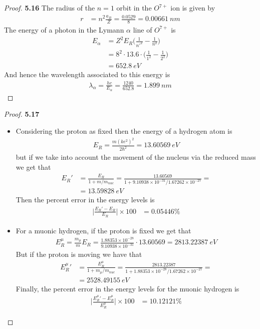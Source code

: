 \documentclass[11pt]{article}
\theoremstyle{definition}
\begin{document}
\begin{proof}{\textbf{5.16}}
    The radius of the $n = 1$ orbit in the $O^{7+}$ ion is given by
    \begin{align*}
        r &= n^2\frac{a_B}{Z} = \frac{0.0529}{8} = 0.00661~nm
    \end{align*}
    The energy of a photon in the Lymann $\alpha$ line of $O^{7+}$ is
    \begin{align*}
        E_\alpha &= Z^2E_R\bigg(\frac{1}{n'^2} - \frac{1}{n^2}\bigg)\\
            &= 8^2\cdot 13.6\cdot\bigg(\frac{1}{1^2} - \frac{1}{2^2}\bigg)\\
            &= 652.8~eV
    \end{align*}
    And hence the wavelength associated to this energy is
    \begin{align*}
        \lambda_\alpha = \frac{hc}{E_\alpha} = \frac{1240}{652.8} = 1.899~nm
    \end{align*}
\end{proof}
\cleardoublepage
\begin{proof}{\textbf{5.17}}
\begin{itemize}
    \item [\textbf{(a)}] Considering the proton as fixed then the energy of
    a hydrogen atom is
    \begin{align*}
        E_R = \frac{m(ke^2)^2}{2\hbar^2} = 13.60569~eV
    \end{align*}
    but if we take into account the movement of the nucleus via the reduced
    mass we get that
    \begin{align*}
        E_R' &= \frac{E_R}{1+ m/m_{nuc}}
        = \frac{13.60569}{1 + {9.10938\times10^{-31}/1.67262\times10^{-27}}} = \\
        &= 13.59828~eV
    \end{align*}
    Then the percent error in the energy levels is
    \begin{align*}
        \bigg|\frac{E_R' - E_R}{E_R}\bigg| \times 100 &= 0.05446 \%
    \end{align*}

    \item [\textbf{(b)}] For a muonic hydrogen, if the proton is fixed we get
    that
    \begin{align*}
        E_R^\mu = \frac{m_\mu}{m}E_R
        = \frac{1.88353\times 10^{-28}}{9.10938\times 10^{-31}} \cdot 13.60569
        = 2813.22387~eV
    \end{align*}
    But if the proton is moving we have that
    \begin{align*}
        {E_R^\mu}' &= \frac{E_R^\mu}{1+ m_\mu/m_{nuc}}
        = \frac{2813.22387}{1 + {1.88353\times 10^{-28}/1.67262\times10^{-27}}}
        = \\
        &= 2528.49155~eV
    \end{align*}
    Finally, the percent error in the energy levels for the muonic hydrogen is
    \begin{align*}
        \bigg|\frac{{E_R^\mu}' - E_R^\mu}{E_R^\mu}\bigg| \times 100
        &=  10.12121\%
    \end{align*}
\end{itemize}
\end{proof}
\end{document}
